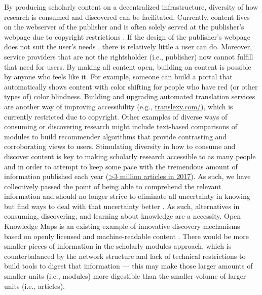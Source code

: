\documentclass[publications,article,submit,moreauthors,pdftex,10pt,a4paper]{Definitions/mdpi}
\begin{document}
By producing scholarly content on a decentralized infrastructure, diversity of how research is consumed and discovered can be facilitated. Currently, content lives on the webserver of the publisher and is often solely served at the publisher's webpage due to copyright restrictions \citep[except for open access articles;][]{doi:10.7717/peerj.4375}. If the design of the publisher's webpage does not suit the user's needs \citep[e.g., due to red color blindness affecting approximately 1 in 20 males and 1 in 100 females;][]{doi:10.1016/j.gendis.2015.02.006}, there is relatively little a user can do. Moreover, service providers that are not the rightsholder (i.e., publisher) now cannot fulfill that need for users. By making all content open, building on content is possible by anyone who feels like it. For example, someone can build a portal that automatically shows content with color shifting for people who have red (or other types of) color blindness. Building and upgrading automated translation services are another way of improving accessibility (e.g., \href{http://translexy.com/}{translexy.com/}), which is currently restricted due to copyright. 
Other examples of diverse ways of consuming or discovering research might include text-based comparisons of modules to build recommender algorithms that provide contrasting and corroborating views to users. Stimulating diversity in how to consume and discover content is key to making scholarly research accessible to as many people and in order to attempt to keep some pace with the tremendous amount of information published each year (\href{https://api.crossref.org/works?filter=type:journal-article,from-pub-date:2017,until-pub-date:2017\&rows=0}{\textgreater{}3
million articles in 2017}). As such, we have collectively passed the point of being able to comprehend the relevant information and should no longer strive to eliminate all uncertainty in knowing but find ways to deal with that uncertainty better \citep{isbn:9781786635471}. As such, alternatives in consuming, discovering, and learning about knowledge are a necessity. Open Knowledge Maps is an existing example of innovative discovery mechanisms based on openly licensed and machine-readable content \citep{doi:10.12685/027.7-4-2-157}. There would be more smaller pieces of information in the scholarly modules approach, which is counterbalanced by the network structure and lack of technical restrictions to build tools to digest that information --- this may make those larger amounts of smaller units (i.e., modules) more digestible than the smaller volume of larger units (i.e., articles). 
\end{document}
